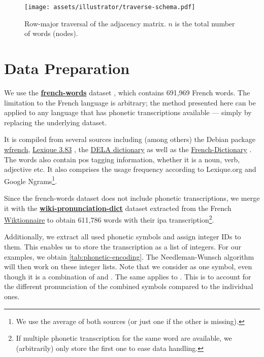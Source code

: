 \begin{figure*}
    \centering
    \texttt{[image: assets/illustrator/traverse-schema.pdf]}
    \caption{Row-major traversal of the adjacency matrix. $n$ is the total number of words (\ie nodes).}
    \label{fig:traverse-schema}
\end{figure*}

\section{Data Preparation}
\label{sec:data}

We use the \href{https://github.com/frodonh/french-words}{\textbf{french-words}} dataset \cite{data_french_words}, which contains 691,969 French words. The limitation to the French language is arbitrary; the method presented here can be applied to any language that has phonetic transcriptions available — simply by replacing the underlying dataset.

It is compiled from several sources including (among others) the Debian package \href{https://packages.debian.org/fr/sid/wfrench}{wfrench}, \href{http://www.lexique.org/}{Lexique 3.83} \cite{data_lexique}, the \href{https://infolingu.univ-mlv.fr/DonneesLinguistiques/Dictionnaires/telechargement.html}{DELA dictionary} \cite{data_dela} as well as the \href{https://github.com/hbenbel/French-Dictionary}{French-Dictionary} \cite{data_french_csv}. The words also contain \acrfull{pos} tagging information, \eg whether it is a noun, verb, adjective etc. It also comprises the usage frequency according to Lexique.org and Google Ngrams\footnote{We use the average of both sources (or just one if the other is missing).}.

Since the french-words dataset does not include phonetic transcriptions, we merge it with the \href{https://github.com/DanielSWolf/wiki-pronunciation-dict}{\textbf{wiki-pronunciation-dict}} \cite{data_pronunciation} dataset extracted from the French \href{https://fr.wiktionary.org/}{Wiktionnaire} to obtain 611,786 words with their \gls{ipa} transcription\footnote{If multiple phonetic transcription for the same word are available, we (arbitrarily) only store the first one to ease data handling.}.

Additionally, we extract all used phonetic symbols and assign integer IDs to them. This enables us to store the transcription as a list of integers. For our examples, we obtain \autoref{tab:phonetic-encoding}. The Needleman-Wunsch algorithm will then work on these integer lists. Note that we consider  as one symbol, even though it is a combination of  and . The same applies to . This is to account for the different pronunciation of the combined symbols compared to the individual ones.

